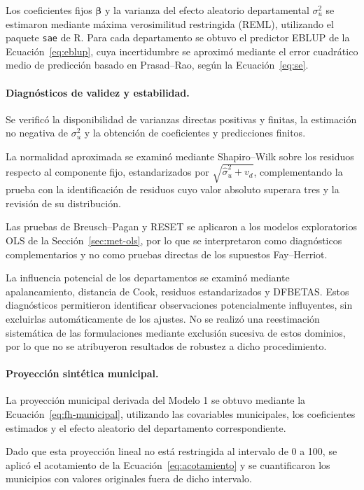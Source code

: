 Los coeficientes fijos $\boldsymbol{\beta}$ y la varianza del efecto aleatorio departamental $\sigma_u^2$ se estimaron mediante máxima verosimilitud restringida (REML), utilizando el paquete \texttt{sae} de R. Para cada departamento se obtuvo el predictor EBLUP de la Ecuación~\ref{eq:eblup}, cuya incertidumbre se aproximó mediante el error cuadrático medio de predicción basado en Prasad--Rao, según la Ecuación~\ref{eq:se}.

\paragraph{Diagnósticos de validez y estabilidad.}

Se verificó la disponibilidad de varianzas directas positivas y finitas, la estimación no negativa de $\sigma_u^2$ y la obtención de coeficientes y predicciones finitos.

La normalidad aproximada se examinó mediante Shapiro--Wilk sobre los residuos respecto al componente fijo, estandarizados por $\sqrt{\widehat{\sigma}_u^2+v_d}$, complementando la prueba con la identificación de residuos cuyo valor absoluto superara tres y la revisión de su distribución.

Las pruebas de Breusch--Pagan y RESET se aplicaron a los modelos exploratorios OLS de la Sección~\ref{sec:met-ols}, por lo que se interpretaron como diagnósticos complementarios y no como pruebas directas de los supuestos Fay--Herriot.

La influencia potencial de los departamentos se examinó mediante apalancamiento, distancia de Cook, residuos estandarizados y DFBETAS. Estos diagnósticos permitieron identificar observaciones potencialmente influyentes, sin excluirlas automáticamente de los ajustes. No se realizó una reestimación sistemática de las formulaciones mediante exclusión sucesiva de estos dominios, por lo que no se atribuyeron resultados de robustez a dicho procedimiento.

\paragraph{Proyección sintética municipal.}

La proyección municipal derivada del Modelo 1 se obtuvo mediante la Ecuación~\ref{eq:fh-municipal}, utilizando las covariables municipales, los coeficientes estimados y el efecto aleatorio del departamento correspondiente.

Dado que esta proyección lineal no está restringida al intervalo de 0 a 100, se aplicó el acotamiento de la Ecuación~\ref{eq:acotamiento} y se cuantificaron los municipios con valores originales fuera de dicho intervalo.

